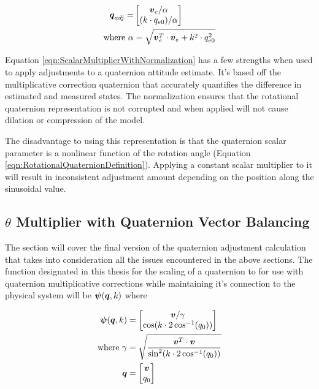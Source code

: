 \begin{equation}
  \begin{aligned}
  \boldsymbol{q}_{adj} = & \begin{bmatrix} \boldsymbol{v}_e / \alpha \\ ( k \cdot q_{e0} )  / \alpha \end{bmatrix} \\
  \text{where } \alpha & = \sqrt{\boldsymbol{v}_e^T \cdot \boldsymbol{v}_e + k^2 \cdot q_{e0}^2}
  \end{aligned}
  \label{eqn:ScalarMultiplierWithNormalization}
\end{equation}

Equation \ref{eqn:ScalarMultiplierWithNormalization} has a few strengths when used to apply adjustments to a quaternion attitude estimate.  It's based off the multiplicative correction quaternion that accurately quantifies the difference in estimated and measured states.  The normalization ensures that the rotational quaternion representation is not corrupted and when applied will not cause dilation or compression of the model.

The disadvantage to using this representation is that the quaternion scalar parameter is a nonlinear function of the rotation angle (Equation \ref{eqn:RotationalQuaternionDefinition}).  Applying a constant scalar multiplier to it will result in inconsistent adjustment amount depending on the position along the sinusoidal value.

\subsection{$\theta$ Multiplier with Quaternion Vector Balancing}
\label{subsec:ThetaMultiplierWithQuaternionVectorBalancing}

The section will cover the final version of the quaternion adjustment calculation that takes into consideration all the issues encountered in the above sections.  The function designated in this thesis for the scaling of a quaternion to for use with quaternion multiplicative corrections while maintaining it's connection to the physical system will be $\boldsymbol{\psi}(\boldsymbol{q}, k)$ where

\begin{equation}
  \begin{aligned}
    \boldsymbol{\psi}(\boldsymbol{q}, k) &= \begin{bmatrix} \boldsymbol{v} / \gamma \\ \cos ( k \cdot 2\cos^{-1} (q_0))  \end{bmatrix} \\
    \text{where } \gamma &= \sqrt{\frac{\boldsymbol{v}^T \cdot \boldsymbol{v}}{\sin^2 ( k \cdot 2\cos^{-1} (q_0))}} \\
    \boldsymbol{q} &= \begin{bmatrix} \boldsymbol{v} \\ q_0  \end{bmatrix}
  \end{aligned}
  \label{eqn:PSI}
\end{equation}

